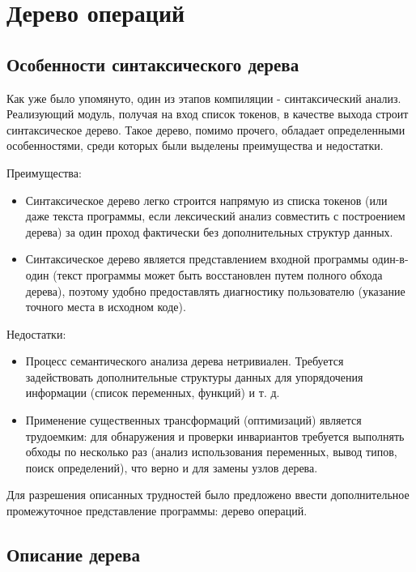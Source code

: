 \newpage
\section{Дерево операций}
\label{sec:optree}

\subsection{Особенности синтаксического дерева}

Как уже было упомянуто, один из этапов компиляции - синтаксический анализ.
Реализующий модуль, получая на вход список токенов, в качестве выхода строит синтаксическое дерево.
Такое дерево, помимо прочего, обладает определенными особенностями, среди которых были выделены преимущества и недостатки.

Преимущества:

\begin{itemize}
    \item Синтаксическое дерево легко строится напрямую из списка токенов (или даже текста программы, если лексический анализ совместить с построением дерева) за один проход фактически без дополнительных структур данных.
    \item 	Синтаксическое дерево является представлением входной программы один-в-один (текст программы может быть восстановлен путем полного обхода дерева), поэтому удобно предоставлять диагностику пользователю (указание точного места в исходном коде).
\end{itemize}

Недостатки:

\begin{itemize}
    \item 	Процесс семантического анализа дерева нетривиален. Требуется задействовать дополнительные структуры данных для упорядочения информации (список переменных, функций) и т. д.
    \item 	Применение существенных трансформаций (оптимизаций) является трудоемким: для обнаружения и проверки инвариантов требуется выполнять обходы по несколько раз (анализ использования переменных, вывод типов, поиск определений), что верно и для замены узлов дерева.
\end{itemize}

Для разрешения описанных трудностей было предложено ввести дополнительное промежуточное представление программы: дерево операций.

\subsection{Описание дерева}

